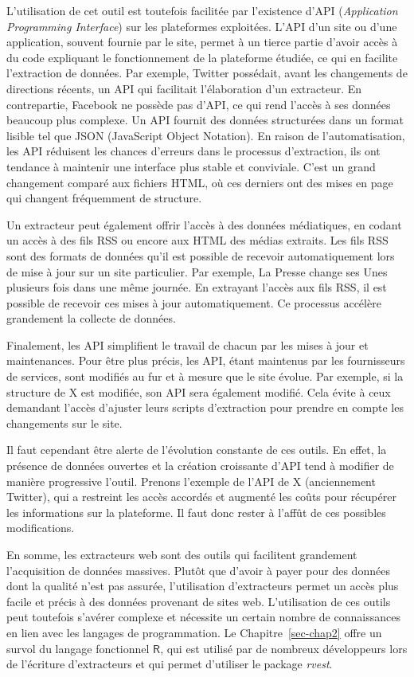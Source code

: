 \documentclass[
  letterpaper,
  DIV=11,
  numbers=noendperiod,
  oneside]{scrreprt}
\begin{document}
L'utilisation de cet outil est toutefois facilitée par l'existence d'API
(\emph{Application Programming Interface}) sur les plateformes
exploitées. L'API d'un site ou d'une application, souvent fournie par le
site, permet à un tierce partie d'avoir accès à du code expliquant le
fonctionnement de la plateforme étudiée, ce qui en facilite l'extraction
de données. Par exemple, Twitter possédait, avant les changements de
directions récents, un API qui facilitait l'élaboration d'un extracteur.
En contrepartie, Facebook ne possède pas d'API, ce qui rend l'accès à
ses données beaucoup plus complexe. Un API fournit des données
structurées dans un format lisible tel que JSON (JavaScript Object
Notation). En raison de l'automatisation, les API réduisent les chances
d'erreurs dans le processus d'extraction, ils ont tendance à maintenir
une interface plus stable et conviviale. C'est un grand changement
comparé aux fichiers HTML, où ces derniers ont des mises en page qui
changent fréquemment de structure.

Un extracteur peut également offrir l'accès à des données médiatiques,
en codant un accès à des fils RSS ou encore aux HTML des médias
extraits. Les fils RSS sont des formats de données qu'il est possible de
recevoir automatiquement lors de mise à jour sur un site particulier.
Par exemple, La Presse change ses Unes plusieurs fois dans une même
journée. En extrayant l'accès aux fils RSS, il est possible de recevoir
ces mises à jour automatiquement. Ce processus accélère grandement la
collecte de données.

Finalement, les API simplifient le travail de chacun par les mises à
jour et maintenances. Pour être plus précis, les API, étant maintenus
par les fournisseurs de services, sont modifiés au fur et à mesure que
le site évolue. Par exemple, si la structure de X est modifiée, son API
sera également modifié. Cela évite à ceux demandant l'accès d'ajuster
leurs scripts d'extraction pour prendre en compte les changements sur le
site.

Il faut cependant être alerte de l'évolution constante de ces outils. En
effet, la présence de données ouvertes et la création croissante d'API
tend à modifier de manière progressive l'outil. Prenons l'exemple de
l'API de X (anciennement Twitter), qui a restreint les accès accordés et
augmenté les coûts pour récupérer les informations sur la plateforme. Il
faut donc rester à l'affût de ces possibles modifications.

En somme, les extracteurs web sont des outils qui facilitent grandement
l'acquisition de données massives. Plutôt que d'avoir à payer pour des
données dont la qualité n'est pas assurée, l'utilisation d'extracteurs
permet un accès plus facile et précis à des données provenant de sites
web. L'utilisation de ces outils peut toutefois s'avérer complexe et
nécessite un certain nombre de connaissances en lien avec les langages
de programmation. Le Chapitre~\ref{sec-chap2} offre un survol du langage
fonctionnel \(\textsf{R}\), qui est utilisé par de nombreux développeurs
lors de l'écriture d'extracteurs et qui permet d'utiliser le package
\emph{rvest}.
\end{document}
